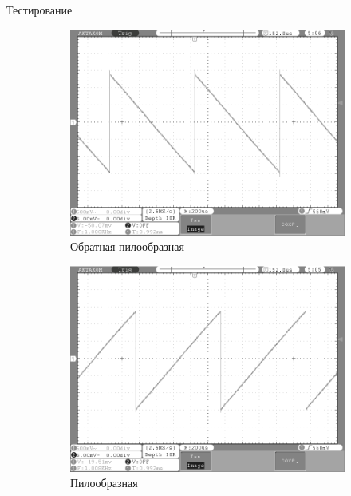 \documentclass[10pt]{beamer}
\begin{document}
\begin{frame}{Тестирование}
\begin{figure}
     \begin{subfigure}[H]{0.4\textwidth}
         \centering
         \includegraphics[width=\textwidth]{l_saw1}
         \caption*{Обратная пилообразная}
     \end{subfigure}
     \hfill
     \begin{subfigure}[H]{0.4\textwidth}
         \centering
         \includegraphics[width=\textwidth]{r_saw1}
         \caption*{Пилообразная}
     \end{subfigure}
     \hfill
     \begin{subfigure}[H]{0.4\textwidth}
         \centering

\end{subfigure}
\end{figure}
\end{frame}
\end{document}
